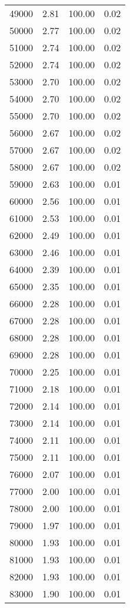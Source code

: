 \begin{table}[ht]
\begin{tabular}{rrrr}
  49000 & 2.81 & 100.00 & 0.02 \\ 
  50000 & 2.77 & 100.00 & 0.02 \\ 
  51000 & 2.74 & 100.00 & 0.02 \\ 
  52000 & 2.74 & 100.00 & 0.02 \\ 
  53000 & 2.70 & 100.00 & 0.02 \\ 
  54000 & 2.70 & 100.00 & 0.02 \\ 
  55000 & 2.70 & 100.00 & 0.02 \\ 
  56000 & 2.67 & 100.00 & 0.02 \\ 
  57000 & 2.67 & 100.00 & 0.02 \\ 
  58000 & 2.67 & 100.00 & 0.02 \\ 
  59000 & 2.63 & 100.00 & 0.01 \\ 
  60000 & 2.56 & 100.00 & 0.01 \\ 
  61000 & 2.53 & 100.00 & 0.01 \\ 
  62000 & 2.49 & 100.00 & 0.01 \\ 
  63000 & 2.46 & 100.00 & 0.01 \\ 
  64000 & 2.39 & 100.00 & 0.01 \\ 
  65000 & 2.35 & 100.00 & 0.01 \\ 
  66000 & 2.28 & 100.00 & 0.01 \\ 
  67000 & 2.28 & 100.00 & 0.01 \\ 
  68000 & 2.28 & 100.00 & 0.01 \\ 
  69000 & 2.28 & 100.00 & 0.01 \\ 
  70000 & 2.25 & 100.00 & 0.01 \\ 
  71000 & 2.18 & 100.00 & 0.01 \\ 
  72000 & 2.14 & 100.00 & 0.01 \\ 
  73000 & 2.14 & 100.00 & 0.01 \\ 
  74000 & 2.11 & 100.00 & 0.01 \\ 
  75000 & 2.11 & 100.00 & 0.01 \\ 
  76000 & 2.07 & 100.00 & 0.01 \\ 
  77000 & 2.00 & 100.00 & 0.01 \\ 
  78000 & 2.00 & 100.00 & 0.01 \\ 
  79000 & 1.97 & 100.00 & 0.01 \\ 
  80000 & 1.93 & 100.00 & 0.01 \\ 
  81000 & 1.93 & 100.00 & 0.01 \\ 
  82000 & 1.93 & 100.00 & 0.01 \\ 
  83000 & 1.90 & 100.00 & 0.01 \\ 

\end{tabular}
\end{table}
